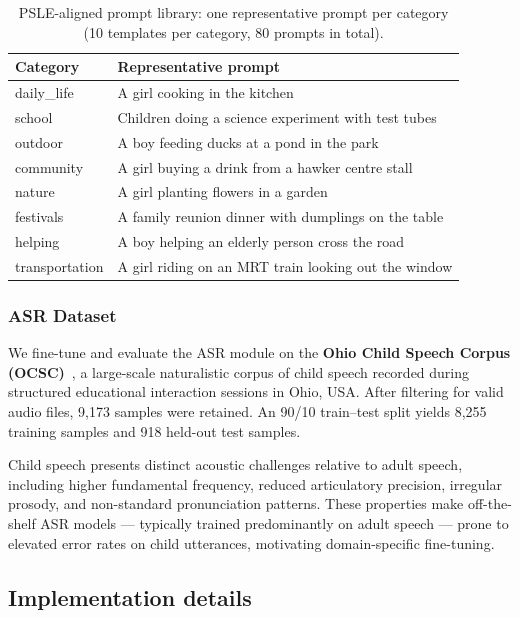 \documentclass{article}
\begin{document}
\begin{table}[t]
\centering
\caption{PSLE-aligned prompt library: one representative prompt per
category (10 templates per category, 80 prompts in total).}
\label{tab:diffusion-categories}
\scriptsize
\setlength{\tabcolsep}{4pt}
\begin{tabular}{ll}
\toprule
\textbf{Category} & \textbf{Representative prompt}\\
\midrule
daily\_life     & A girl cooking in the kitchen\\
school          & Children doing a science experiment with test tubes\\
outdoor         & A boy feeding ducks at a pond in the park\\
community       & A girl buying a drink from a hawker centre stall\\
nature          & A girl planting flowers in a garden\\
festivals       & A family reunion dinner with dumplings on the table\\
helping         & A boy helping an elderly person cross the road\\
transportation  & A girl riding on an MRT train looking out the window\\
\bottomrule
\end{tabular}
\end{table}

\subsubsection{ASR Dataset}
\label{sec:asr-dataset}
 
We fine-tune and evaluate the ASR module on the \textbf{Ohio Child
Speech Corpus (OCSC)}~\cite{wagner2025ocsc}, a large-scale naturalistic
corpus of child speech recorded during structured educational
interaction sessions in Ohio, USA.
After filtering for valid audio files, 9{,}173 samples were retained.
An 90/10 train–test split yields 8{,}255 training samples and
918 held-out test samples.
 
Child speech presents distinct acoustic challenges relative to adult
speech, including higher fundamental frequency, reduced articulatory
precision, irregular prosody, and non-standard pronunciation patterns.
These properties make off-the-shelf ASR models — typically trained
predominantly on adult speech — prone to elevated error rates on child
utterances, motivating domain-specific fine-tuning.

\subsection{Implementation details}
\end{document}
